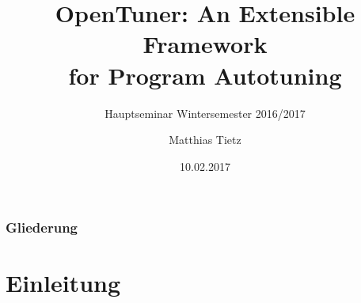 
\usepackage[utf8]{inputenc}
\usepackage{babel}
\usepackage{floatflt}
\usepackage{float}
\usepackage{graphics}
\usepackage{listings}
\usepackage{color}


%
%

\title{OpenTuner: An Extensible Framework \\ for Program Autotuning}
\subtitle{Hauptseminar Wintersemester 2016/2017}
\author{Matthias Tietz}

\date{10.02.2017}
\institute[TUC]



    \tucthreeheadlines
    
    \begin{frame}
      \titlepage
    \end{frame}

    \begin{frame}

       \frametitle{Gliederung}
       \tableofcontents

    \end{frame}


    \tuctwoheadlines

    

    \section{Einleitung}
    


